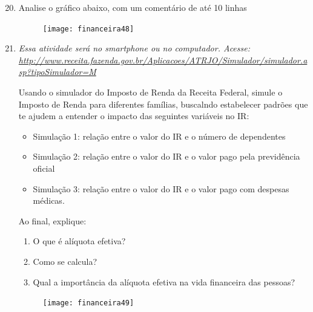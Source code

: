 \begin{enumerate}\setcounter{enumi}{19}
\item Analise o gráfico abaixo, com um comentário de até 10 linhas

\begin{figure}[H]
\centering

\texttt{[image: financeira48]}
\end{figure}

\item 
\textit{Essa atividade será no smartphone ou no computador. Acesse: \url{http://www.receita.fazenda.gov.br/Aplicacoes/ATRJO/Simulador/simulador.asp?tipoSimulador=M}}

Usando o simulador do Imposto de Renda da Receita Federal, simule o Imposto de Renda para diferentes famílias, buscalndo estabelecer padrões que te ajudem a entender o impacto das seguintes variáveis no IR:

  \begin{itemize}
  \item Simulação 1: relação entre o valor do IR e o número de dependentes
  \item Simulação 2: relação entre o valor do IR e o valor pago pela previdência oficial
  \item Simulação 3: relação entre o valor do IR e o valor pago com despesas médicas.
  \end{itemize}

Ao final, explique:
  \begin{enumerate}
    \item O que é alíquota efetiva?
    \item Como se calcula?
    \item Qual a importância da alíquota efetiva na vida financeira das pessoas?
  \end{enumerate}
\begin{figure}[H]
\centering

\texttt{[image: financeira49]}
\end{figure}
\end{enumerate}


